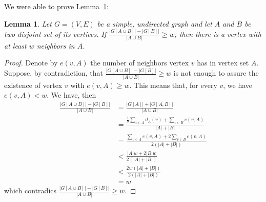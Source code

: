 \documentclass[12pt]{article}
\newtheorem{lemma}[theorem]{Lemma}
\begin{document}
We were able to prove Lemma~\ref{lemma1}:

\begin{lemma} \label{lemma1}
  Let $G = (V, E)$ be a simple, undirected graph and let $A$ and $B$ be two disjoint set of its vertices.
  If $\frac{|G[A \cup B]| - |G[B]|}{|A \cup B|} \ge w$, then there is a vertex with at least $w$ neighbors in $A$.
\end{lemma}

\begin{proof}
  Denote by $e(v, A)$ the number of neighbors vertex $v$ has in vertex set $A$.
  Suppose, by contradiction, that $\frac{|G[A \cup B]| - |G[B]|}{|A \cup B|} \ge w$ is not enough to assure the existence of vertex $v$ with $e(v, A) \ge w$.
  This means that, for every $v$, we have $e(v, A) < w$.
  We have, then
  \begin{align*}
    \frac{|G[A \cup B]| - |G[B]|}{|A \cup B|} &= \frac{|G[A]| + |G[A, B]|}{|A \cup B|} \\
                                              &= \frac{\frac{1}{2}\sum_{v \in A}d_A(v) + \sum_{v \in B}e(v, A)}{|A| + |B|} \\
                                              &= \frac{\sum_{v \in A}e(v, A) + 2\sum_{v \in B}e(v, A)}{2(|A| + |B|)} \\
                                              &< \frac{|A|w + 2|B|w}{2(|A| + |B|)} \\
                                              &< \frac{2w(|A| + |B|)}{2(|A| + |B|)} \\
                                              &= w
  \end{align*}
  which contradics $\frac{|G[A \cup B]| - |G[B]|}{|A \cup B|} \ge w$.
\end{proof}



\end{document}
